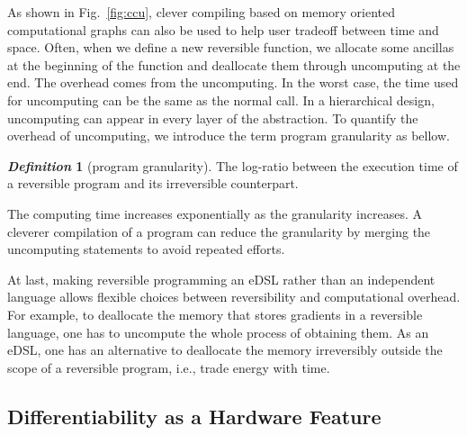 \documentclass{article}
\newcommand{\<}{\langle}
\renewcommand{\>}{\rangle}
\newcommand{\Fig}[1]{Fig.~\ref{#1}}
\theoremstyle{definition}\newtheorem{definition}{\textit{Definition}}
\begin{document}
As shown in \Fig{fig:ccu}, clever compiling based on memory oriented computational graphs can also be used to help user tradeoff between time and space.
Often, when we define a new reversible function, we allocate some ancillas at the beginning of the function and deallocate them through uncomputing at the end.
The overhead comes from the uncomputing. In the worst case, the time used for uncomputing can be the same as the normal call.
In a hierarchical design, uncomputing can appear in every layer of the abstraction. To quantify the overhead of uncomputing, we introduce the term program granularity as bellow.
\begin{definition}[program granularity]
    The log-ratio between the execution time of a reversible program and its irreversible counterpart.
\end{definition}
The computing time increases exponentially as the granularity increases.
A cleverer compilation of a program can reduce the granularity by merging the uncomputing statements to avoid repeated efforts.

At last, making reversible programming an eDSL rather than an independent language allows flexible choices between reversibility and computational overhead. For example, to deallocate the memory that stores gradients in a reversible language, one has to uncompute the whole process of obtaining them.
As an eDSL, one has an alternative to deallocate the memory irreversibly outside the scope of a reversible program, i.e., trade energy with time.



\subsection{Differentiability as a Hardware Feature}\label{sec:hardware}
\end{document}
